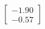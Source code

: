\documentclass[preview]{standalone}
\begin{document}
\begin{align*}
\begin{bmatrix} -1.90 \\ -0.57 \end{bmatrix}
\end{align*}
\end{document}
